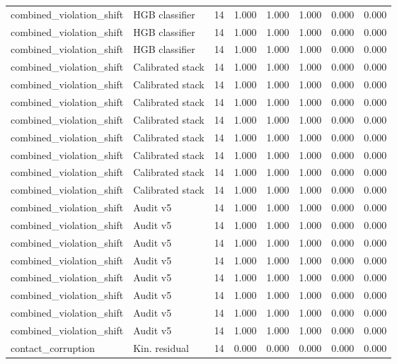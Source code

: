 {\begin{longtable}{llrrrrrr}
combined\_violation\_shift & HGB classifier & 14 & 1.000 & 1.000 & 1.000 & 0.000 & 0.000 \\
combined\_violation\_shift & HGB classifier & 14 & 1.000 & 1.000 & 1.000 & 0.000 & 0.000 \\
combined\_violation\_shift & HGB classifier & 14 & 1.000 & 1.000 & 1.000 & 0.000 & 0.000 \\
combined\_violation\_shift & Calibrated stack & 14 & 1.000 & 1.000 & 1.000 & 0.000 & 0.000 \\
combined\_violation\_shift & Calibrated stack & 14 & 1.000 & 1.000 & 1.000 & 0.000 & 0.000 \\
combined\_violation\_shift & Calibrated stack & 14 & 1.000 & 1.000 & 1.000 & 0.000 & 0.000 \\
combined\_violation\_shift & Calibrated stack & 14 & 1.000 & 1.000 & 1.000 & 0.000 & 0.000 \\
combined\_violation\_shift & Calibrated stack & 14 & 1.000 & 1.000 & 1.000 & 0.000 & 0.000 \\
combined\_violation\_shift & Calibrated stack & 14 & 1.000 & 1.000 & 1.000 & 0.000 & 0.000 \\
combined\_violation\_shift & Calibrated stack & 14 & 1.000 & 1.000 & 1.000 & 0.000 & 0.000 \\
combined\_violation\_shift & Calibrated stack & 14 & 1.000 & 1.000 & 1.000 & 0.000 & 0.000 \\
combined\_violation\_shift & Audit v5 & 14 & 1.000 & 1.000 & 1.000 & 0.000 & 0.000 \\
combined\_violation\_shift & Audit v5 & 14 & 1.000 & 1.000 & 1.000 & 0.000 & 0.000 \\
combined\_violation\_shift & Audit v5 & 14 & 1.000 & 1.000 & 1.000 & 0.000 & 0.000 \\
combined\_violation\_shift & Audit v5 & 14 & 1.000 & 1.000 & 1.000 & 0.000 & 0.000 \\
combined\_violation\_shift & Audit v5 & 14 & 1.000 & 1.000 & 1.000 & 0.000 & 0.000 \\
combined\_violation\_shift & Audit v5 & 14 & 1.000 & 1.000 & 1.000 & 0.000 & 0.000 \\
combined\_violation\_shift & Audit v5 & 14 & 1.000 & 1.000 & 1.000 & 0.000 & 0.000 \\
combined\_violation\_shift & Audit v5 & 14 & 1.000 & 1.000 & 1.000 & 0.000 & 0.000 \\
contact\_corruption & Kin. residual & 14 & 0.000 & 0.000 & 0.000 & 0.000 & 0.000 \\

\end{longtable}}
